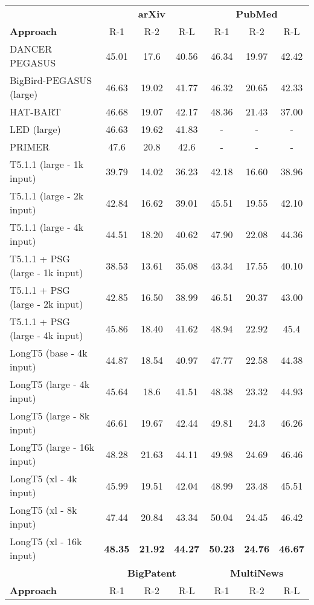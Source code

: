 \documentclass[11pt]{article}
\begin{document}
\begin{table*}
\small
\centering
\begin{tabular}{lcccccc}
\toprule
& \multicolumn{3}{c}{\textbf{arXiv}} & \multicolumn{3}{c}{\textbf{PubMed}} \\
\textbf{Approach} & R-1 & R-2 & R-L & R-1 & R-2 & R-L\\
\midrule
DANCER PEGASUS & 45.01 & 17.6 & 40.56 & 46.34 & 19.97 & 42.42 \\
BigBird-PEGASUS (large) & 46.63 & 19.02 & 41.77 & 46.32 & 20.65 & 42.33  \\
HAT-BART & 46.68 & 19.07 & 42.17 & 48.36 & 21.43 & 37.00 \\
LED (large) & 46.63 & 19.62 & 41.83 & - & - & -  \\ PRIMER & 47.6 & 20.8 & 42.6 & - & - & - \\
\midrule
T5.1.1 (large - 1k input) & 39.79 & 14.02 & 36.23 & 42.18 & 16.60 & 38.96 \\
T5.1.1 (large - 2k input) & 42.84 & 16.62 & 39.01 & 45.51 & 19.55 & 42.10 \\
T5.1.1 (large - 4k input) & 44.51 & 18.20 & 40.62 & 47.90 & 22.08 & 44.36 \\
T5.1.1 + PSG (large - 1k input) & 38.53 & 13.61 & 35.08 & 43.34 & 17.55 & 40.10 \\
T5.1.1 + PSG (large - 2k input) & 42.85 & 16.50 & 38.99 & 46.51 & 20.37 & 43.00 \\
T5.1.1 + PSG (large - 4k input) & 45.86 & 18.40 & 41.62 & 48.94 & 22.92 & 45.4 \\
LongT5 (base - 4k input) & 44.87 & 18.54 & 40.97 & 47.77 & 22.58 & 44.38 \\
LongT5 (large - 4k input) & 45.64 & 18.6 & 41.51 & 48.38 & 23.32 & 44.93 \\
LongT5 (large - 8k input) & 46.61 & 19.67 & 42.44 & 49.81 & 24.3 & 46.26 \\
LongT5 (large - 16k input) & 48.28 & 21.63 & 44.11 & 49.98 & 24.69 & 46.46 \\
LongT5 (xl - 4k input) & 45.99 & 19.51 & 42.04 & 48.99 & 23.48 & 45.51 \\
LongT5 (xl - 8k input) & 47.44 & 20.84 & 43.34 & 50.04 & 24.45 & 46.42 \\
LongT5 (xl - 16k input) & \textbf{48.35} & \textbf{21.92} & \textbf{44.27} & \textbf{50.23} & \textbf{24.76} & \textbf{46.67} \\
\toprule
& \multicolumn{3}{c}{\textbf{BigPatent}} & \multicolumn{3}{c}{\textbf{MultiNews}} \\
\textbf{Approach} & R-1 & R-2 & R-L & R-1 & R-2 & R-L\\

\end{tabular}
\end{table*}
\end{document}
